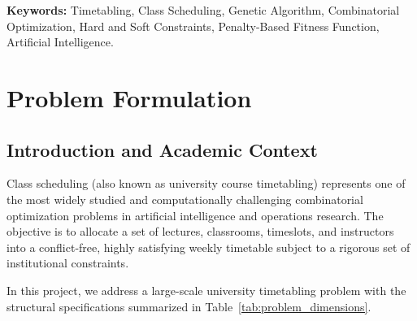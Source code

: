 \documentclass[12pt,a4paper]{report}
\begin{document}
\textbf{Keywords:} Timetabling, Class Scheduling, Genetic Algorithm, Combinatorial Optimization, Hard and Soft Constraints, Penalty-Based Fitness Function, Artificial Intelligence.

\newpage

\tableofcontents
\newpage

\listoffigures
\newpage

\listoftables
\newpage

\chapter{Problem Formulation}

\section{Introduction and Academic Context}
Class scheduling (also known as university course timetabling) represents one of the most widely studied and computationally challenging combinatorial optimization problems in artificial intelligence and operations research. The objective is to allocate a set of lectures, classrooms, timeslots, and instructors into a conflict-free, highly satisfying weekly timetable subject to a rigorous set of institutional constraints.

In this project, we address a large-scale university timetabling problem with the structural specifications summarized in Table~\ref{tab:problem_dimensions}.
\end{document}
